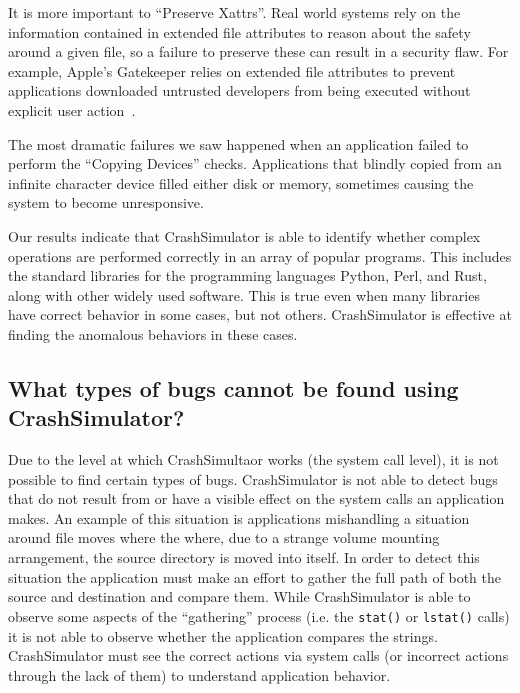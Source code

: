 It is more important to ``Preserve Xattrs''.  Real world systems rely on the
information contained in extended file attributes to reason about the safety
around a given file, so a failure to preserve these can result in a
security flaw.  For example, Apple's Gatekeeper relies on extended file
attributes to prevent applications downloaded untrusted developers from being
executed without explicit user action~\cite{AppleCodesigning}.



The most dramatic failures we saw happened when an application failed to 
perform the ``Copying Devices'' checks.  Applications that blindly copied 
from an infinite character device filled either disk or memory, sometimes
causing the system to become unresponsive.

Our results indicate that CrashSimulator is able to identify whether complex
operations are performed correctly in an array of popular programs.  
This includes the standard libraries for the programming languages Python,
Perl, and Rust, along with other widely used software.  This is true even
when many libraries have correct behavior in some cases, but not others.
CrashSimulator is effective at finding the anomalous behaviors in these
cases.

\subsection{What types of bugs cannot be found using CrashSimulator?}
\label{sec-not-found}

Due to the level at which CrashSimultaor works (the system call level), it is
not possible to find certain types of bugs.  CrashSimulator is not able to
detect bugs that do not result from or have a visible effect on the system calls
an application makes.  An example of this situation 
is applications mishandling a situation around file moves where the
where, due to a strange volume mounting arrangement, the source directory is
moved into itself.  In order to detect this situation the application must make
an effort to gather the full path of both the source and destination and compare
them.  While CrashSimulator is able to observe some aspects of the ``gathering''
process (i.e. the {\tt stat()} or {\tt lstat()} calls) it is not able to observe
whether the application compares the strings.  
CrashSimulator must see the correct actions via system calls (or incorrect
actions through the lack of them) to understand application behavior.

